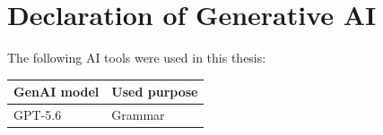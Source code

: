 \chapter*{Declaration of Generative AI}

The following AI tools were used in this thesis:

\begin{center}
\renewcommand{\arraystretch}{1.35}
\begin{tabular}{|p{}|p{}|}
\hline
\textbf{GenAI model} & \textbf{Used purpose} \\
\hline
GPT-5.6 & Grammar \\
\hline
\end{tabular}
\end{center}

